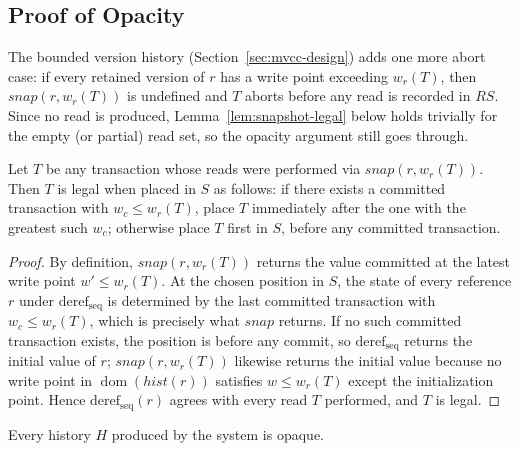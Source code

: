 \subsection{Proof of Opacity}
\label{subsec:opacity-proof}

\begin{remark}
  \label{rem:trimming}
  The bounded version history (Section~\ref{sec:mvcc-design}) adds one more
  abort case: if every retained version of $r$ has a write point exceeding
  $w_r(T)$, then $\mathit{snap}(r, w_r(T))$ is undefined and $T$ aborts before
  any read is recorded in $RS$. Since no read is produced,
  Lemma~\ref{lem:snapshot-legal} below holds trivially for the empty (or
  partial) read set, so the opacity argument still goes through.
\end{remark}

\begin{lemma}
  \label{lem:snapshot-legal}
  Let $T$ be any transaction whose reads were performed via
  $\mathit{snap}(r, w_r(T))$. Then $T$ is legal when placed in $S$ as follows:
  if there exists a committed transaction with $w_c \leq w_r(T)$, place $T$
  immediately after the one with the greatest such $w_c$; otherwise place $T$
  first in $S$, before any committed transaction.
\end{lemma}

\begin{proof}
  By definition, $\mathit{snap}(r, w_r(T))$ returns the value committed at the
  latest write point $w' \leq w_r(T)$. At the chosen position in $S$, the
  state of every reference $r$ under $\text{deref}_{\mathrm{seq}}$ is
  determined by the last committed transaction with $w_c \leq w_r(T)$, which
  is precisely what $\mathit{snap}$ returns. If no such committed transaction
  exists, the position is before any commit, so $\text{deref}_{\mathrm{seq}}$
  returns the initial value of $r$; $\mathit{snap}(r, w_r(T))$ likewise
  returns the initial value because no write point in
  $\operatorname{dom}(\mathit{hist}(r))$ satisfies $w \leq w_r(T)$ except the
  initialization point. Hence $\text{deref}_{\mathrm{seq}}(r)$ agrees with
  every read $T$ performed, and $T$ is legal.
\end{proof}

\begin{theorem}
  Every history $H$ produced by the system is opaque.
\end{theorem}

